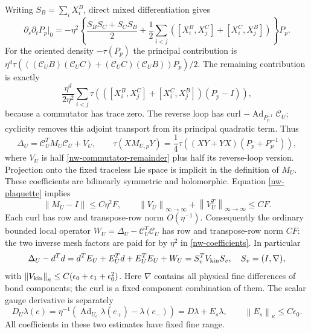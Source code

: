 \documentclass[11pt]{article}
\theoremstyle{remark}
\newcommand{\norm}[1]{\left\|#1\right\|}
\begin{document}
Writing $S_B=\sum_iX_i^B$, direct mixed differentiation gives
\begin{equation}\label{nw-mixed}
 \partial_s\partial_tP_p\big|_0=-\eta^2
 \left\{\frac{S_BS_C+S_CS_B}{2}
 +\frac12\sum_{i<j}
 ([X_i^B,X_j^C]+[X_i^C,X_j^B])\right\}P_p.
\end{equation}
For the oriented density $-\tau(P_p)$ the principal contribution is
$\eta^d\tau(((\mathcal C_UB)(\mathcal C_UC)
+(\mathcal C_UC)(\mathcal C_UB))P_p)/2$.
The remaining contribution is exactly
\begin{equation}\label{nw-commutator-remainder}
 \frac{\eta^d}{2\eta^2}\sum_{i<j}
 \tau\left(([X_i^B,X_j^C]+[X_i^C,X_j^B])(P_p-I)\right),
\end{equation}
because a commutator has trace zero. The reverse loop has curl
$-\operatorname{Ad}_{P_p^{-1}}\mathcal C_U$; cyclicity removes this
adjoint transport from its principal quadratic term. Thus
\begin{equation}\label{nw-hessian}
 \Delta_U=\mathcal C_U^TM_U\mathcal C_U+V_U,\qquad
 \tau(XM_{U,p}Y)=\frac14\tau((XY+YX)(P_p+P_p^{-1})),
\end{equation}
where $V_U$ is half \eqref{nw-commutator-remainder} plus half its
reverse-loop version. Projection onto the fixed traceless Lie space
is implicit in the definition of $M_U$. These coefficients are
bilinearly symmetric and holomorphic. Equation \eqref{nw-plaquette}
implies
\begin{equation}\label{nw-coefficients}
 \norm{M_U-I}\le C\eta^2F,
 \qquad \norm{V_U}_{\infty\to\infty}
       +\norm{V_U^T}_{\infty\to\infty}\le CF.
\end{equation}
Each curl has row and transpose-row norm $O(\eta^{-1})$.
Consequently the ordinary bounded local operator
$W_U=\Delta_U-\mathcal C_U^T\mathcal C_U$ has row and
transpose-row norm $CF$: the two inverse mesh factors are paid for
by $\eta^2$ in \eqref{nw-coefficients}. In particular
\begin{equation}\label{nw-small-form}
 \Delta_U-d^Td=d^TE_U+E_U^Td+E_U^TE_U+W_U
       =S_v^TV_{\rm kin}S_v,
 \quad S_v=(I,\nabla),
\end{equation}
with $\norm{V_{\rm kin}}_\kappa\le
C(\epsilon_0+\epsilon_1+\epsilon_0^2)$.
Here $\nabla$ contains all physical fine differences of bond
components; the curl is a fixed component combination of them.
The scalar gauge derivative is separately
\begin{equation}\label{nw-scalar-gradient}
 D_U\lambda(e)=\eta^{-1}
  (\operatorname{Ad}_{U_e}\lambda(e_+)-\lambda(e_-))
  =D\lambda+E_s\lambda,
 \qquad \norm{E_s}_\kappa\le C\epsilon_0.
\end{equation}
All coefficients in these two estimates have fixed fine range.
\end{document}
